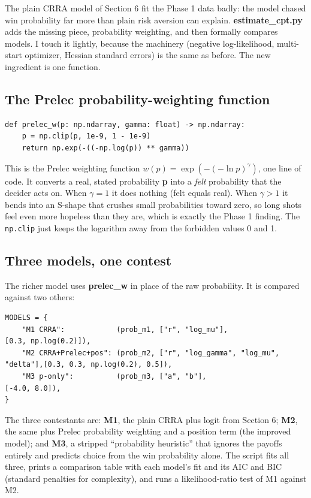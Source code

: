 \documentclass[11pt]{article}
\newcommand{\file}[1]{\textbf{\ttfamily #1}}
\begin{document}
The plain CRRA model of Section 6 fit the Phase 1 data badly: the model chased win probability far
more than plain risk aversion can explain. \file{estimate\_cpt.py} adds the missing piece,
probability weighting, and then formally compares models. I touch it lightly, because the machinery
(negative log-likelihood, multi-start optimizer, Hessian standard errors) is the same as before. The
new ingredient is one function.

\subsection{The Prelec probability-weighting function}

\begin{lstlisting}[style=py,firstnumber=39]
def prelec_w(p: np.ndarray, gamma: float) -> np.ndarray:
    p = np.clip(p, 1e-9, 1 - 1e-9)
    return np.exp(-((-np.log(p)) ** gamma))
\end{lstlisting}

This is the Prelec weighting function $w(p) = \exp(-(-\ln p)^{\gamma})$, one line of code. It converts
a real, stated probability \file{p} into a \emph{felt} probability that the decider acts on. When
$\gamma = 1$ it does nothing (felt equals real). When $\gamma > 1$ it bends into an S-shape that
crushes small probabilities toward zero, so long shots feel even more hopeless than they are, which is
exactly the Phase 1 finding. The \verb|np.clip| just keeps the logarithm away from the forbidden values
0 and 1.

\subsection{Three models, one contest}

The richer model uses \file{prelec\_w} in place of the raw probability. It is compared against two
others:

\begin{lstlisting}[style=py,firstnumber=78]
MODELS = {
    "M1 CRRA":            (prob_m1, ["r", "log_mu"],                      [0.3, np.log(0.2)]),
    "M2 CRRA+Prelec+pos": (prob_m2, ["r", "log_gamma", "log_mu", "delta"],[0.3, 0.3, np.log(0.2), 0.5]),
    "M3 p-only":          (prob_m3, ["a", "b"],                           [-4.0, 8.0]),
}
\end{lstlisting}

The three contestants are: \textbf{M1}, the plain CRRA plus logit from Section 6; \textbf{M2}, the same
plus Prelec probability weighting and a position term (the improved model); and \textbf{M3}, a stripped
``probability heuristic'' that ignores the payoffs entirely and predicts choice from the win
probability alone. The script fits all three, prints a comparison table with each model's fit and its
AIC and BIC (standard penalties for complexity), and runs a likelihood-ratio test of M1 against M2.
\end{document}
